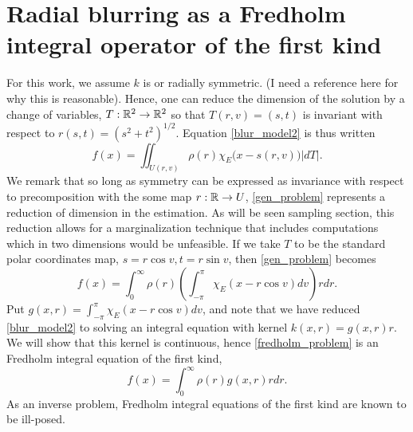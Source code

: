 \documentclass{amsart}
\theoremstyle{plain}
\begin{document}
\section{Radial blurring as a Fredholm integral operator of the first kind}
For this work, we assume  $k$ is or radially symmetric. 
(I need a reference here for why this is reasonable).
Hence, one can reduce the dimension of the solution by a change of variables, $T:\mathbb R^2 \to \mathbb R^2$ so that $T(r,v) = (s,t)$ is invariant with respect to $r(s,t) = (s^2 + t^2)^{1/2}$.
Equation \eqref{blur_model2} is thus written
\begin{equation}
  f(x) = \iint_{U(r,v)} \rho(r) \chi_E\big(x - s(r,v)\big) \big|dT\big|. 
  \label{gen_problem}
\end{equation}
We remark that so long as symmetry can be expressed as invariance with respect to precomposition with the some map $r:\mathbb R\to U$, \eqref{gen_problem} represents a reduction of dimension in the estimation.
As will be seen sampling section, this reduction allows for a marginalization technique that includes computations which in two dimensions would be unfeasible.
If we take $T$ to be the standard polar coordinates map, $s=r\cos v, t=r\sin v$, then \eqref{gen_problem} becomes
\begin{equation}
  f(x) = \int_0^\infty\rho(r) \left( \int_{-\pi}^{\pi} \chi_E(x - r\cos v)d v \right)rdr.
  \label{acos_form}
\end{equation}
Put $g(x,r)=\int_{-\pi}^{\pi} \chi_E(x - r\cos v)d v$, and note that we have reduced \eqref{blur_model2} to solving an integral equation with kernel $k(x,r) = g(x,r) r$.  
We will show that this kernel is continuous, hence \eqref{fredholm_problem} is an Fredholm integral equation of the first kind,
\begin{equation}
  f(x) = \int_0^\infty\rho(r) g(x,r) r dr. \label{fredholm_problem}
\end{equation} 
As an inverse problem, Fredholm integral equations of the first kind are known to be ill-posed.
\end{document}
